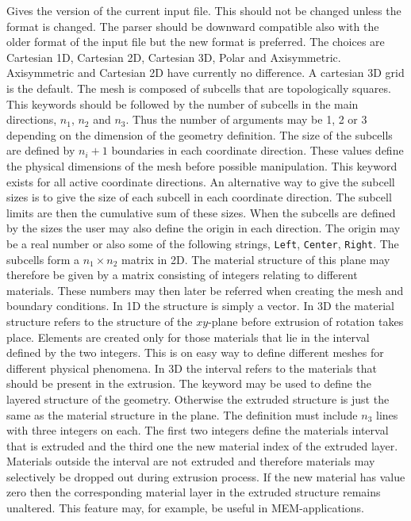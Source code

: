 \sifbegin
{}
Gives the version of the current input file. This should not be changed unless
the format is changed. The parser should be downward compatible also with the older
format of the input file but the new format is preferred.
The choices are Cartesian 1D, Cartesian 2D, Cartesian 3D, Polar and 
Axisymmetric. Axisymmetric and Cartesian 2D have currently
no difference.
A cartesian 3D grid is the default.
%
The mesh is composed of subcells that are 
topologically squares. 
This keywords should be followed by the 
number of subcells in the main directions,
$n_1$, $n_2$ and $n_3$.
Thus the number of 
arguments may be 1, 2 or 3 depending on the dimension of the geometry 
definition. 
The size of the subcells are defined by $n_i+1$ boundaries
in each coordinate direction. These values define the physical 
dimensions of the mesh before possible manipulation. 
This keyword exists for all active coordinate directions.  
%
An alternative way to give the subcell sizes is to give the size of 
each subcell in each coordinate direction. 
The subcell limits are then the cumulative sum of these sizes.
%
When the subcells are defined by the sizes the user may also define the origin 
in each direction. The origin may be a real number or also some of the following 
strings, \texttt{Left}, \texttt{Center}, \texttt{Right}.
%
The subcells form a $n_1 \times n_2$ matrix in 2D. 
The material structure of this plane may therefore be given by a matrix 
consisting of integers relating to different materials.
These numbers may then later be referred
when creating the mesh and boundary conditions.
In 1D the structure is simply a vector.
In 3D the material structure refers to the structure of the 
$xy$-plane before extrusion of rotation takes place. 
%
Elements are created only for those materials that 
lie in the interval defined by the two integers.
This is on easy way to define different meshes for different physical
phenomena.
In 3D the interval refers to the materials that should be present
in the extrusion. 
%
The keyword may be used to define the layered 
structure of the geometry. Otherwise the extruded structure is just the same
as the material structure in the plane. 
The definition must include $n_3$ lines with three integers on each. 
The first two integers define the materials interval that is extruded and
the third one the new material index of the extruded layer.
Materials outside the interval are not extruded and therefore 
materials may selectively be dropped out during extrusion process. 
If the new material has value zero then the corresponding material layer in the 
extruded structure remains unaltered.
This feature may, for example, be useful in MEM-applications. 

